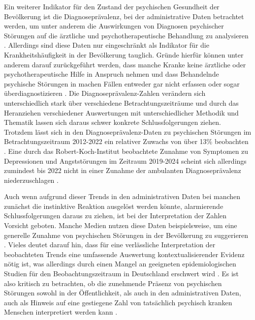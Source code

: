 Ein weiterer Indikator für den Zustand der psychischen Gesundheit der Bevölkerung ist die Diagnoseprävalenz, 
bei der administrative Daten betrachtet werden, 
um unter anderem die Auswirkungen von Diagnosen psychischer Störungen auf die ärztliche 
und psychotherapeutische Behandlung zu analysieren \cite[]{thom_trends_2024}.    %
Allerdings sind diese Daten nur eingeschränkt als Indikator für die Krankheitshäufigkeit in der Bevölkerung tauglich. 
Gründe hierfür können unter anderem darauf zurückgeführt werden, 
dass manche Kranke keine ärztliche oder psychotherapeutische Hilfe in Anspruch nehmen 
und dass Behandelnde psychische Störungen in machen Fällen entweder gar nicht erfassen 
oder sogar überdiagnostizieren \cite[]{thom_trends_2024}.        %
Die Diagnoseprävalenz-Zahlen verändern sich unterschiedlich stark über verschiedene Betrachtungszeiträume 
und durch das Heranziehen verschiedener Auswertungen mit unterschiedlicher Methodik und Thematik 
lassen sich daraus schwer konkrete Schlussfolgerungen ziehen. 
Trotzdem lässt sich in den Diagnoseprävalenz-Daten zu psychischen Störungen im Betrachtungszeitraum 
2012-2022 ein relativer Zuwachs von über 13\% beobachten \cite[]{thom_trends_2024}.     %
Eine durch das Robert-Koch-Institut beobachtete Zunahme von Symptomen zu Depressionen und Angststörungen 
im Zeitraum 2019-2024 \cite[]{robert-koch-institut_beobachtung_2024}   %
scheint sich allerdings zumindest bis 2022 nicht in einer Zunahme der ambulanten Diagnoseprävalenz niederzuschlagen 
\cite[]{thom_trends_2024}. %

Auch wenn aufgrund dieser Trends in den administrativen Daten bei manchen zunächst 
die instinktive Reaktion ausgelöst werden könnte, alarmierende Schlussfolgerungen daraus zu ziehen, 
ist bei der Interpretation der Zahlen Vorsicht geboten.
Manche Medien nutzen diese Daten beispielsweise, um eine generelle Zunahme von psychischen Störungen 
in der Bevölkerung zu suggerieren 
\cite[]{nickels_psychische_2020,knollenborg_zahl_2024}. %
Vieles deutet darauf hin, dass für eine verlässliche Interpretation der beobachteten Trends 
eine umfassende Auswertung kontextualisierender Evidenz nötig ist, was allerdings durch einen Mangel 
an geeigneten epidemiologischen Studien für den Beobachtungszeitraum in Deutschland erschwert wird 
\cite[]{thom_trends_2024}.    %
Es ist also kritisch zu betrachten, ob die zunehmende Präsenz von psychischen Störungen sowohl in der Öffentlichkeit, 
als auch in den administrativen Daten, auch als Hinweis auf eine gestiegene Zahl 
von tatsächlich psychisch kranken Menschen interpretiert werden kann \cite[]{wagner_psychische_2021}. %


